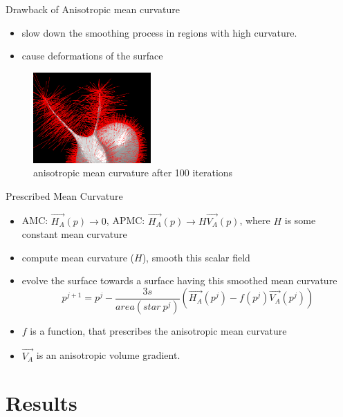 \documentclass{beamer}
\begin{document}
\begin{frame}{Drawback of Anisotropic mean curvature}
\begin{itemize}
\item slow down the smoothing process in regions with high curvature. 
\item cause deformations of the surface
\end{itemize}
\begin{figure}[htb]
\centering
\includegraphics[width=0.4\textwidth]{aniso_bunny_100it.PNG}
\caption{anisotropic mean curvature after 100 iterations}
\label{fig:deform}
\end{figure}
\end{frame}

\begin{frame}{Prescribed Mean Curvature}
\begin{itemize}
\item AMC: $\vec{H_A}(p) \rightarrow 0$, APMC: $\vec{H_A}(p) \rightarrow H\vec{V_A}(p)$, where $H$ is some constant mean curvature
\item compute mean curvature ($H$), smooth this scalar field
\item evolve the surface towards a surface having this smoothed mean curvature
\begin{equation*}
p^{j+1} = p^{j} - \dfrac{3s}{area(star\ p^j)}(\vec{H_A}(p^j) - f(p^j)\vec{V_A}(p^j))
\end{equation*}
\item $f$ is a function, that prescribes the anisotropic mean curvature
\item $\vec{V_A}$ is an anisotropic volume gradient.
\end{itemize}
\end{frame}


\section{Results}
\end{document}
